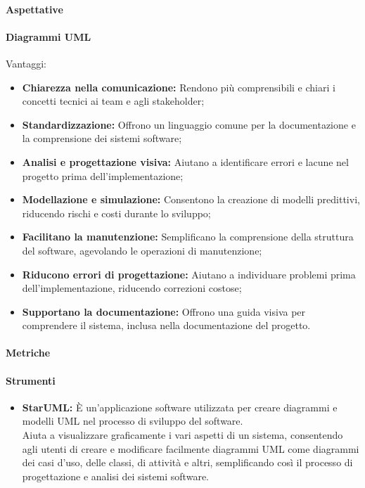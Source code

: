 \paragraph{Aspettative}

\paragraph{Diagrammi UML}
Vantaggi:
\begin{itemize}
    \item \textbf{Chiarezza nella comunicazione:} Rendono più comprensibili e chiari i concetti tecnici ai team e agli stakeholder;
    \item \textbf{Standardizzazione:} Offrono un linguaggio comune per la documentazione e la comprensione dei sistemi software;
    \item \textbf{Analisi e progettazione visiva:} Aiutano a identificare errori e lacune nel progetto prima dell'implementazione;
    \item \textbf{Modellazione e simulazione:} Consentono la creazione di modelli predittivi, riducendo rischi e costi durante lo sviluppo;
    \item \textbf{Facilitano la manutenzione:} Semplificano la comprensione della struttura del software, agevolando le operazioni di manutenzione;
    \item \textbf{Riducono errori di progettazione:} Aiutano a individuare problemi prima dell'implementazione, riducendo correzioni costose;
    \item \textbf{Supportano la documentazione:} Offrono una guida visiva per comprendere il sistema, inclusa nella documentazione del progetto.
\end{itemize}

\paragraph{Metriche}

\paragraph{Strumenti}
\begin{itemize}
    \item \textbf{StarUML:} 
    È un'applicazione software utilizzata per creare diagrammi e modelli UML nel processo di sviluppo del software. \\
    Aiuta a visualizzare graficamente i vari aspetti di un sistema, consentendo agli utenti di creare e modificare facilmente diagrammi UML come diagrammi dei casi d'uso, delle classi, di attività e altri, semplificando così il processo di progettazione e analisi dei sistemi software.
\end{itemize}

